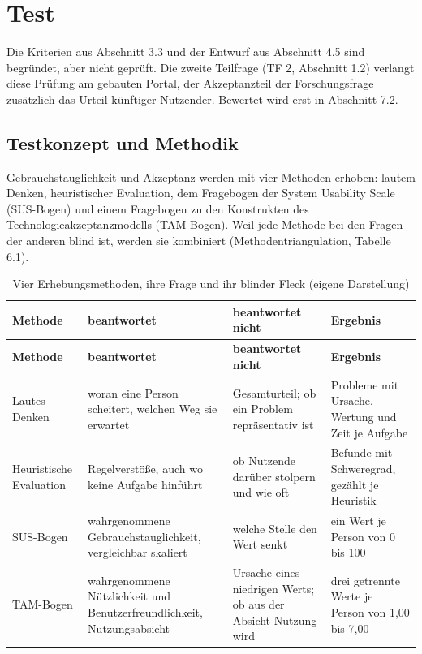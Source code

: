 
\chapter{Test}
\label{kap:test}

Die Kriterien aus Abschnitt 3.3 und der Entwurf aus Abschnitt 4.5 sind begründet, aber nicht geprüft. Die zweite Teilfrage (TF 2, Abschnitt 1.2) verlangt diese Prüfung am gebauten Portal, der Akzeptanzteil der Forschungsfrage zusätzlich das Urteil künftiger Nutzender. Bewertet wird erst in Abschnitt 7.2.

\section{Testkonzept und Methodik}
\label{sec:testkonzept}

Gebrauchstauglichkeit und Akzeptanz werden mit vier Methoden erhoben: lautem Denken, heuristischer Evaluation, dem Fragebogen der System Usability Scale (SUS-Bogen) und einem Fragebogen zu den Konstrukten des Technologieakzeptanzmodells (TAM-Bogen). Weil jede Methode bei den Fragen der anderen blind ist, werden sie kombiniert (Methodentriangulation, Tabelle 6.1).

\begingroup
\small
\setlength{\tabcolsep}{4pt}
\begin{longtable}{@{}L{2.5cm}L{3.6cm}L{3.6cm}L{4.2cm}@{}}
	\caption[Vier Erhebungsmethoden, ihre Frage und ihr blinder Fleck]{Vier Erhebungsmethoden, ihre Frage und ihr blinder Fleck (eigene Darstellung)}
	\label{tab:methoden}\\
	\toprule
	\textbf{Methode} & \textbf{beantwortet} & \textbf{beantwortet nicht} & \textbf{Ergebnis} \\
	\midrule
	\endfirsthead
	\toprule
	\textbf{Methode} & \textbf{beantwortet} & \textbf{beantwortet nicht} & \textbf{Ergebnis} \\
	\midrule
	\endhead
	\bottomrule
	\endfoot
	Lautes Denken & woran eine Person scheitert, welchen Weg sie erwartet & Gesamturteil; ob ein Problem repräsentativ ist & Probleme mit Ursache, Wertung und Zeit je Aufgabe \\
	Heuristische Evaluation & Regelverstöße, auch wo keine Aufgabe hinführt & ob Nutzende darüber stolpern und wie oft & Befunde mit Schweregrad, gezählt je Heuristik \\
	SUS-Bogen & wahrgenommene Gebrauchstauglichkeit, vergleichbar skaliert & welche Stelle den Wert senkt & ein Wert je Person von 0 bis 100 \\
	TAM-Bogen & wahrgenommene Nützlichkeit und Benutzerfreundlichkeit, Nutzungsabsicht & Ursache eines niedrigen Werts; ob aus der Absicht Nutzung wird & drei getrennte Werte je Person von 1,00 bis 7,00 \\
\end{longtable}
\endgroup

